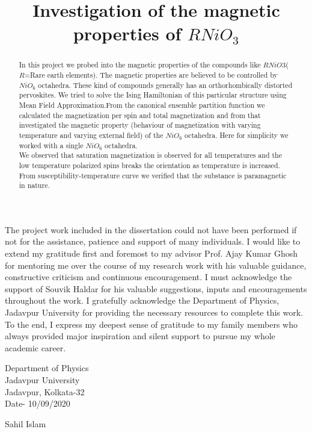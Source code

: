 \documentclass[24pt]{article}
\begin{document}
\begin{large}
The project work included in the dissertation could not have been performed if not for the assistance, patience and support of many individuals. I would like to extend my gratitude first and foremost to my advisor Prof. Ajay Kumar Ghosh for mentoring me over the course of my research work with his valuable guidance, constructive criticism and continuous encouragement. I must acknowledge the support of Souvik Haldar for his valuable suggestions, inputs and encouragements throughout the work. 
    I gratefully acknowledge the Department of Physics, Jadavpur University for providing the necessary resources to complete this work.
    To the end, I express my deepest sense of gratitude to my family members who always provided major inspiration and silent support to pursue my whole academic career. \\
\end{large}

\begin{flushleft}
\begin{large}
Department of Physics\\	
Jadavpur University\\
Jadavpur, Kolkata-32\\
Date- 10/09/2020\\
\end{large}
\end{flushleft}

\begin{flushright}
{\large Sahil Islam}
\end{flushright}

\newpage
\tableofcontents
\newpage


\title{{\LARGE \textbf{Investigation of the magnetic properties of \textbf{$RNiO_3$}}}}
\author{}
\date{}
\maketitle
\begin{abstract}


 In this project we probed into the magnetic properties of the compounds like $RNiO3$($R$=Rare earth elements). The magnetic properties are believed to be controlled by $NiO_6$ octahedra. These kind of compounds generally has an  orthorhombically distorted pervoskites. We tried to solve the Ising Hamiltonian of this particular structure using Mean Field Approximation.From the canonical ensemble partition function we calculated the magnetization per spin and total magnetization and from that  investigated the magnetic property (behaviour of magnetization with varying temperature and varying external field) of the $NiO_6$ octahedra. Here for simplicity we worked with a single $NiO_6$ octahedra.\\
 We observed that saturation magnetization is observed for all temperatures and the low temperature polarized spins breaks the orientation as temperature is increased. From susceptibility-temperature curve we verified that the substance is paramagnetic in nature. \\


\end{abstract}
\end{document}
